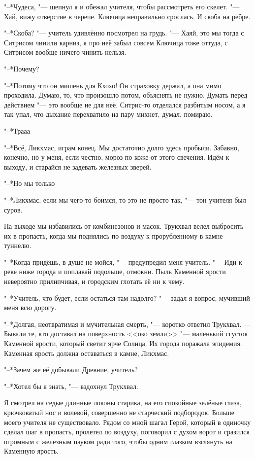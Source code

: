 "--*Чудеса, "--- шепнул я и обежал учителя, чтобы рассмотреть его скелет.
"--- Хай, вижу отверстие в черепе.
Ключица неправильно срослась.
И скоба на ребре.

"--*Скоба? "--- учитель удивлённо посмотрел на грудь.
"--- Хаяй, это мы тогда с Ситрисом чинили карниз, я про неё забыл совсем\ldotst
Ключица тоже оттуда, с Ситрисом вообще ничего чинить нельзя.

"--*Почему?

"--*Потому что он мишень для Кхохо!
Он страховку держал, а она мимо проходила.
Думаю, то, что произошло потом, объяснять не нужно.
Думать перед действием "--- это вообще не для неё.
Ситрис-то отделался разбитым носом, а я так упал, что дыхание перехватило на пару михнет, думал, помираю.

"--*Трааа\ldotst

"--*Всё, Ликхмас, играм конец.
Мы достаточно долго здесь пробыли.
Забавно, конечно, но у меня, если честно, мороз по коже от этого свечения.
Идём к выходу, и старайся не задевать железных зверей.

"--*Но мы только\ldotst

"--*Ликхмас, если мы чего-то боимся, то это не просто так, "--- тон учителя был суров.

\razd

На выходе мы избавились от комбинезонов и масок.
Трукхвал велел выбросить их в пропасть, когда мы поднялись по воздуху к прорубленному в камне туннелю.

"--*Когда придёшь, в душе не мойся, "--- предупредил меня учитель.
"--- Иди к реке ниже города и поплавай подольше, отмокни.
Пыль Каменной ярости невероятно прилипчивая, и городским глотать её ни к чему.

"--*Учитель, что будет, если остаться там надолго? "--- задал я вопрос, мучивший меня всю дорогу.

"--*Долгая, неотвратимая и мучительная смерть, "--- коротко ответил Трукхвал.
--- Бывали те, кто доставал на поверхность <<око земли>> "--- маленький сгусток Каменной ярости, который светит ярче Солнца.
Их города поражала эпидемия.
Каменная ярость должна оставаться в камне, Ликхмас.

"--*Зачем же её добывали Древние, учитель?

"--*Хотел бы я знать, "--- вздохнул Трукхвал.

Я смотрел на седые длинные локоны старика, на его спокойные зелёные глаза, крючковатый нос и волевой, совершенно не старческий подбородок.
Больше моего учителя не существовало.
Рядом со мной шагал Герой, который в одиночку сделал шаг в пропасть, пролетел по воздуху, поговорил с духом ворот и сразился огромным с железным пауком ради того, чтобы одним глазком взглянуть на Каменную ярость.


